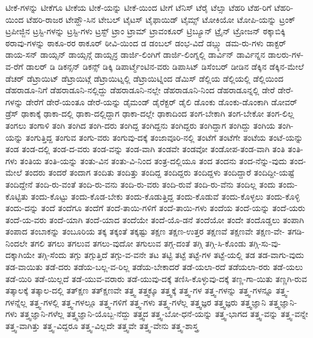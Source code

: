 {ಟೀಕೆ-ಗಳನ್ನು
ಟೀಕೆಗೂ
ಟೀಕೆಯ
ಟೀಕೆ-ಯನ್ನು
ಟೀಕೆ-ಯಿಂದ
ಟೀಗೆ
ಟೆನಿಸ್
ಟೆರೈ
ಟೆಲ್ಸಾ
ಟೆಹರಿ
ಟೆಹ-ರಿಗೆ
ಟೆಹರಿ-ಯಿಂದ
ಟೆಹರಿ-ರಾಜರ
ಟೇಪ್ಹೌ-ಸಿನ
ಟೇಬಲ್
ಟೈಟಸ್
ಟೈಫಾಯಿಡ್
ಟೈಮ್ಸ್
ಟೋಕಿಯೋ
ಟೋಪಿ-ಯನ್ನು
ಟ್ರಂಕ್
ಟ್ರಪೀಜ್ಜಿನ
ಟ್ರಸ್ಟಿ-ಗಳನ್ನು
ಟ್ರಸ್ಟಿ-ಗಳು
ಟ್ರಸ್ಟ್
ಟ್ರಾಂ
ಟ್ರಾಮ್
ಟ್ರಾವಂಕೂರ್
ಟ್ರಿಬ್ಯೂನ್
ಟ್ರೈನ್
ಟ್ರೋಜನ್
ಠಕ್ಕಾಬಿಕ್ಕಿ
ಠರಾವು-ಗಳನ್ನು
ಠಾಕೂ-ರರ
ಠಾಕೂರ್
ಠೀವಿ-ಯಿಂದ
ಡ
ಡಂಬಲ್
ಡಂಭ-ವಿದೆ
ಡಬ್ಲ್ಯು
ಡಮ-ರು-ಗಳು
ಡಾಕ್ಟರ್
ಡಾಯ-ಸನ್
ಡಾಯ್ಸನ್
ಡಾಯ್ಸನ್ಗೆ
ಡಾಯ್ಸನ್ರ
ಡಾರ್ಜಿ-ಲಿಂಗಿಗೆ
ಡಾರ್ಜಿ-ಲಿಂಗ್ನಲ್ಲಿ
ಡಾರ್ವಿನ್
ಡಾರ್ವಿನ್ನನ
ಡಾಲರು-ಗಳ-ವ-ರೆಗೆ
ಡಾಲರ್
ಡಿ
ಡಿಕನ್ಸನ್
ಡಿಕನ್ಸ್
ಡಿಕ್ಕಿ
ಡಿಪಾರ್ಟ್ಮೆಂಟಿನ-ವರು
ಡಿಪಾಸಿಟ್
ಡಿಸೆಂಬರ್
ಡೀಡಿನ
ಡೆಕ್ಕಿನ
ಡೆಕ್ಕಿನ-ಮೇಲೆ
ಡೆಚರ್
ಡೆಟ್ರಾಯಿಟ್
ಡೆಟ್ರಾಯಿಟ್ಗೆ
ಡೆಟ್ರಾಯಿಟ್ನಲ್ಲಿ
ಡೆಟ್ರಾಯಿಟ್ನಿಂದ
ಡೆಮಿಸ್
ಡೆಲ್ಲಿಯ
ಡೆಲ್ಲಿಯಲ್ಲಿ
ಡೆಲ್ಲಿಯಿಂದ
ಡೆಹರಾಡೂ-ನಿಗೆ
ಡೆಹರಾಡೂನಿ-ನಲ್ಲಿದ್ದು
ಡೆಹರಾಡೂನಿ-ನಲ್ಲೇ
ಡೆಹರಾಡೂನಿ-ನಿಂದ
ಡೆಹರಾಡೂನ್ನಲ್ಲಿ
ಡೇರೆ
ಡೇರೆ-ಗಳನ್ನು
ಡೇರೆಗೆ
ಡೇರೆ-ಯಂತೂ
ಡೇರೆ-ಯನ್ನು
ಡೈಮಂಡ್
ಡೈರೆಕ್ಟರ್
ಡೈಲಿ
ಡೊಂಕು
ಡೊಂಕು-ಡೊಂಕಾಗಿ
ಡೋವರ್
ಡ್ರೆಸ್
ಢಾಕಾಕ್ಕೆ
ಢಾಕಾ-ದಲ್ಲಿ
ಢಾಕಾ-ದಲ್ಲಿದ್ದಾಗ
ಢಾಕಾ-ದಲ್ಲೇ
ಢಾಕಾದಿಂದ
ತಂಗ-ಬೇಕಾಗಿ
ತಂಗ-ಬೇಕೋ
ತಂಗ-ಲಿಲ್ಲ
ತಂಗಲು
ತಂಗಾಳಿ
ತಂಗಿ
ತಂಗಿದ
ತಂಗಿ-ದರು
ತಂಗಿದ್ದ
ತಂಗಿದ್ದನು
ತಂಗಿದ್ದರು
ತಂಗಿದ್ದಾಗ
ತಂಗಿದ್ದು
ತಂಗಿಯ
ತಂಗಿ-ಯನ್ನು
ತಂಗುತ್ತಿದ್ದ
ತಂಗುವ
ತಂಗು-ವರು
ತಂಗುವು-ದಕ್ಕೆ
ತಂಜಾವೂರಿ-ನಲ್ಲಿ
ತಂಟೆಗೆ
ತಂಟೆಗೇ
ತಂಟೆಯ
ತಂಟೆ-ಯನ್ನು
ತಂಡ
ತಂಡ-ದಲ್ಲಿ
ತಂಡ-ದ-ವರು
ತಂಡ-ವನ್ನು
ತಂಡ-ವಾಗಿ
ತಂಡವೇ
ತಂಡವೋ
ತಂಡೋಪ-ತಂಡ-ವಾಗಿ
ತಂತಿ
ತಂತಿ-ಗಳು
ತಂತಿಯ
ತಂತಿ-ಯನ್ನು
ತಂತು-ವಿನ
ತಂತು-ವಿ-ನಿಂದ
ತಂತ್ರ-ದಲ್ಲಿಯೂ
ತಂದ
ತಂದನು
ತಂದ-ನೆನ್ನು-ವುದು
ತಂದ-ಮೇಲೆ
ತಂದರು
ತಂದರೆ
ತಂದಾಗ
ತಂದಿತು
ತಂದಿತ್ತು
ತಂದಿದ್ದ
ತಂದಿದ್ದರು
ತಂದಿದ್ದಳು
ತಂದಿದ್ದಾರೆ
ತಂದಿದ್ದೀ-ಯಷ್ಟೆ
ತಂದಿದ್ದೇನೆ
ತಂದಿ-ರು-ವಂತೆ
ತಂದಿ-ರು-ವನು
ತಂದಿ-ರು-ವರು
ತಂದಿ-ರುವೆ
ತಂದಿ-ರು-ವೆನು
ತಂದಿಲ್ಲ
ತಂದು
ತಂದು-ಕೊಟ್ಟಿತು
ತಂದು-ಕೊಟ್ಟು
ತಂದು-ಕೊಡ-ಬೇಕು
ತಂದು-ಕೊಡುತ್ತಿದ್ದ
ತಂದು-ಕೊಡುವೆ
ತಂದು-ಕೊಳ್ಳಲು
ತಂದು-ಕೊಳ್ಳಿ
ತಂದು-ದನ್ನು
ತಂದೆ
ತಂದೆಗೂ
ತಂದೆಗೆ
ತಂದೆ-ತಾಯಿ-ಗಳಿಗೆ
ತಂದೆ-ತಾಯಿ-ಗಳು
ತಂದೆಯ
ತಂದೆ-ಯನ್ನು
ತಂದೆ-ಯರು
ತಂದೆ-ಯ-ವರು
ತಂದೆ-ಯಾಗಿ
ತಂದೆ-ಯಾದ
ತಂದೆಯೇ
ತಂದೆ-ಯೊ-ಡನೆ
ತಂದೆಯೋ
ತಂದೇ
ತಂದೊಡ್ಡಲು
ತಂಪಾಗಿ
ತಂಪಾದ
ತಂಬಾಕನ್ನು
ತಂಬೂರಿಯ
ತಕ್ಕ
ತಕ್ಕಂತೆ
ತಕ್ಕಷ್ಟು
ತಕ್ಷಣ
ತಕ್ಷಣ-ಉತ್ತರ
ತಕ್ಷಣವೆ
ತಕ್ಷಣವೇ
ತಕ್ಷಣ-ವೇ-
ತಗಡಿ-ನಿಂದಲೇ
ತಗಲಿ
ತಗಲು
ತಗಲುವ
ತಗಲು-ವುದೋ
ತಗುಲುವ
ತಗ್ಗ-ದಂತೆ
ತಗ್ಗಿ
ತಗ್ಗಿ-ಸಿ-ಕೊಂಡು
ತಗ್ಗಿ-ಸು-ವು-ದಕ್ಕಾಗಿಯೇ
ತಗ್ಗಿ-ಸೆಂದು
ತಗ್ಗು
ತಗ್ಗುತ್ತಿದೆ
ತಗ್ಗು-ವ-ವನೇ
ತಟ
ತಟ್ಟಿ
ತಟ್ಟೆ
ತಟ್ಟೆ-ಗಳ
ತಟ್ಟೆ-ಯಲ್ಲಿ
ತಡ
ತಡ-ವಾಗು-ವುದು
ತಡ-ವಾಯಿತು
ತಡೆ-ದರು
ತಡೆಯ-ಬಲ್ಲ-ವ-ರಿಲ್ಲ
ತಡೆಯ-ಬೇಕಾದರೆ
ತಡೆ-ಯಲಾ-ರದೆ
ತಡೆಯಲಾ-ರರು
ತಡೆ-ಯಲು
ತಡೆ-ಯಿರಿ
ತಡೆ-ಯಿಲ್ಲದೆ
ತಡೆ-ಯುವ-ವರಾರು
ತಡೆ-ಯುವು-ದಕ್ಕೆ
ತಣಿಸಿ-ಕೊಳ್ಳುವು-ದಕ್ಕೆ
ತಣ್ಣ-ಗಾ-ಯಿತು
ತಣ್ಣಗಿ-ರುವ
ತತ್ಕಾಲಕ್ಕೆ
ತತ್ಕಾಲ-ದಲ್ಲಿ
ತತ್ಕ್ಷಣ
ತತ್ಕ್ಷಣವೇ
ತತ್ತ್ವ
ತತ್ತ್ವಕ್ಕೂ
ತತ್ತ್ವಕ್ಕೆ
ತತ್ತ್ವ-ಗಳ
ತತ್ತ್ವ-ಗಳನ್ನು
ತತ್ತ್ವ-ಗಳನ್ನೂ
ತತ್ತ್ವ-ಗಳನ್ನೆಲ್ಲ
ತತ್ತ್ವ-ಗಳಲ್ಲಿ
ತತ್ತ್ವ-ಗಳಲ್ಲೂ
ತತ್ತ್ವ-ಗಳಿಗೆ
ತತ್ತ್ವ-ಗಳು
ತತ್ತ್ವ-ಗಳೆಲ್ಲ
ತತ್ತ್ವಜ್ಞರ
ತತ್ತ್ವಜ್ಞರು
ತತ್ತ್ವಜ್ಞಾನಿ
ತತ್ತ್ವಜ್ಞಾನಿ-ಗಳು
ತತ್ತ್ವಜ್ಞಾನಿ-ಗಳೆಲ್ಲ
ತತ್ತ್ವಜ್ಞಾನಿ-ಯೊಬ್ಬ-ನೆದ್ದು
ತತ್ತ್ವದ
ತತ್ತ್ವ-ಬೋ-ಧನೆ-ಯನ್ನು
ತತ್ತ್ವ-ಭಾಗದ
ತತ್ತ್ವ-ವನ್ನು
ತತ್ತ್ವ-ವನ್ನೇ
ತತ್ತ್ವ-ವಾಗಿತ್ತು
ತತ್ತ್ವ-ವಿದ್ದರೂ
ತತ್ತ್ವ-ವಿಲ್ಲದೇ
ತತ್ತ್ವವೇ
ತತ್ತ್ವ-ವೇನು
ತತ್ತ್ವ-ಶಾಸ್ತ್ರ
}
